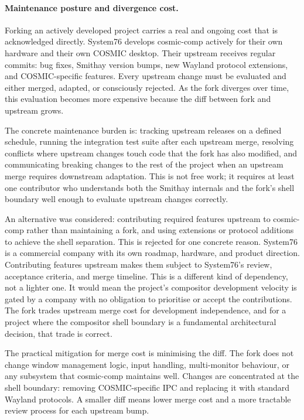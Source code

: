 \paragraph{Maintenance posture and divergence cost.}
Forking an actively developed project carries a real and ongoing cost that is
acknowledged directly. System76 develops cosmic-comp actively for their own
hardware and their own COSMIC desktop. Their upstream receives regular commits:
bug fixes, Smithay version bumps, new Wayland protocol extensions, and
COSMIC-specific features. Every upstream change must be evaluated and either
merged, adapted, or consciously rejected. As the fork diverges over time,
this evaluation becomes more expensive because the diff between fork and
upstream grows.

The concrete maintenance burden is: tracking upstream releases on a defined
schedule, running the integration test suite after each upstream merge,
resolving conflicts where upstream changes touch code that the fork has also
modified, and communicating breaking changes to the rest of the project when
an upstream merge requires downstream adaptation. This is not free work; it
requires at least one contributor who understands both the Smithay internals
and the fork's shell boundary well enough to evaluate upstream changes
correctly.

An alternative was considered: contributing required features upstream to
cosmic-comp rather than maintaining a fork, and using extensions or protocol
additions to achieve the shell separation. This is rejected for one concrete
reason. System76 is a commercial company with its own roadmap, hardware, and
product direction. Contributing features upstream makes them subject to
System76's review, acceptance criteria, and merge timeline. This is a
different kind of dependency, not a lighter one. It would mean the project's
compositor development velocity is gated by a company with no obligation to
prioritise or accept the contributions. The fork trades upstream merge cost
for development independence, and for a project where the compositor shell
boundary is a fundamental architectural decision, that trade is correct.

The practical mitigation for merge cost is minimising the diff. The fork does
not change window management logic, input handling, multi-monitor behaviour,
or any subsystem that cosmic-comp maintains well. Changes are concentrated at
the shell boundary: removing COSMIC-specific IPC and replacing it with
standard Wayland protocols. A smaller diff means lower merge cost and a
more tractable review process for each upstream bump.

